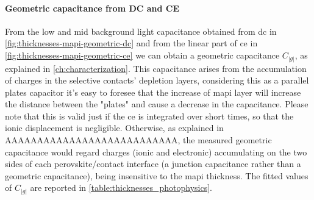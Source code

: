 \paragraph{Geometric capacitance from DC and CE}
From the low and mid background light capacitance obtained from \gls{dc} in \cref{fig:thicknesses-mapi-geometric-dc} and from the linear part of \gls{ce} in \cref{fig:thicknesses-mapi-geometric-ce} we can obtain a geometric capacitance $C_|g|$, as explained in \cref{ch:characterization}.
This capacitance arises from the accumulation of charges in the selective contacts' depletion layers, considering this as a parallel plates capacitor it's easy to foresee that the increase of \gls{mapi} layer will increase the distance between the "plates" and cause a decrease in the capacitance.
Please note that this is valid just if the \gls{ce} is integrated over short times, so that the ionic displacement is negligible.
Otherwise, as explained in AAAAAAAAAAAAAAAAAAAAAAAAAAA, the measured geometric capacitance would regard charges (ionic and electronic) accumulating on the two sides of each perovskite\-/contact interface (a junction capacitance rather than a geometric capacitance), being insensitive to the \gls{mapi} thickness.
The fitted values of $C_|g|$ are reported in \cref{table:thicknesses_photophysics}.

\begin{figure}
\end{figure}


